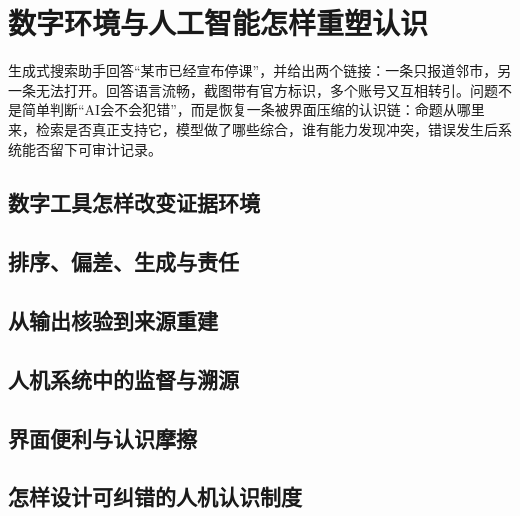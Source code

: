 \chapter{数字环境与人工智能怎样重塑认识}

\begin{openingcase}
生成式搜索助手回答“某市已经宣布停课”，并给出两个链接：一条只报道邻市，另一条无法打开。回答语言流畅，截图带有官方标识，多个账号又互相转引。问题不是简单判断“AI会不会犯错”，而是恢复一条被界面压缩的认识链：命题从哪里来，检索是否真正支持它，模型做了哪些综合，谁有能力发现冲突，错误发生后系统能否留下可审计记录。
\end{openingcase}

\section{数字工具怎样改变证据环境}


\section{排序、偏差、生成与责任}


\section{从输出核验到来源重建}


\section{人机系统中的监督与溯源}



\section{界面便利与认识摩擦}



\section{怎样设计可纠错的人机认识制度}



